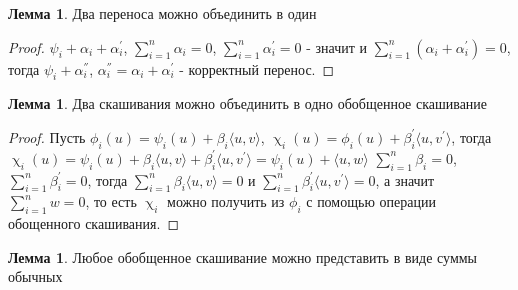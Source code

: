 \documentclass[fontsize=14pt]{scrartcl}
\theoremstyle{definition}
\newtheorem{lemma}[theorem]{Лемма}
\begin{document}
\begin{lemma}
	Два переноса можно объединить в один
\end{lemma}

\begin{proof}
$\psi_i + \alpha_i + \alpha^{'}_i$, $\sum_{i=1}^n\alpha_i = 0$, $\sum_{i=1}^n\alpha^{'}_i = 0$ - значит и $\sum_{i=1}^n(\alpha_i + \alpha^{'}_i) = 0$, тогда $\psi_i + \alpha^{''}_i$, $\alpha^{''}_i = \alpha_i + \alpha^{'}_i$ - корректный перенос.	
\end{proof}

\begin{lemma}
\label{joinshear}
	Два скашивания можно объединить в одно обобщенное скашивание
\end{lemma}
\begin{proof}
	Пусть $\phi_i(u) = \psi_i(u) + \beta_i\langle u, v \rangle$, $\upchi_i(u) = \phi_i(u) + \beta^{'}_i\langle u, v^{'} \rangle$, тогда $\upchi_i(u) = \psi_i(u) + \beta_i\langle u, v \rangle + \beta^{'}_i\langle u, v^{'} \rangle = \psi_i(u) + \langle u, w \rangle$
$\sum_{i=1}^{n} \beta_i = 0$, 
$\sum_{i=1}^{n} \beta^{'}_i = 0$, 
тогда $\sum_{i=1}^{n} \beta_i\langle u, v\rangle= 0$ и $\sum_{i=1}^{n} \beta^{'}_i\langle u, v^{'}\rangle= 0$, 
а значит $\sum_{i=1}^{n} w = 0$, то есть $\upchi_i$ можно получить из $\phi_i$ с помощью операции обощенного скашивания.
\end{proof}

\begin{lemma}
\label{usual}
	Любое обобщенное скашивание можно представить в виде суммы обычных
\end{lemma}
\end{document}
